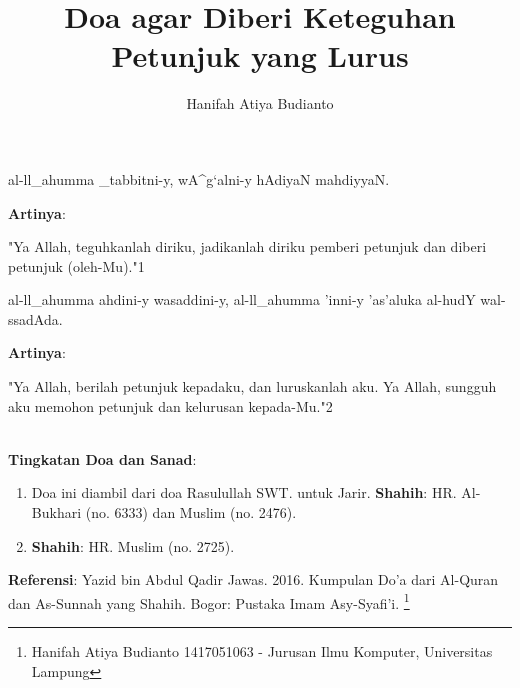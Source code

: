 \documentclass[a4paper,12pt]{article}
\title{\Large Doa agar Diberi Keteguhan Petunjuk yang Lurus}
\author{\calligra Hanifah Atiya Budianto}
\begin{document}
\sffamily
\maketitle 
\fullvocalize
{}
\begin{arabtext}
\noindent
al-ll_ahumma _tabbitni-y, wA^g`alni-y hAdiyaN mahdiyyaN.\\
\end{arabtext}
\noindent
\textbf{Artinya}:
\par
\indent
"Ya Allah, teguhkanlah diriku, jadikanlah diriku pemberi petunjuk dan 
diberi petunjuk (oleh-Mu)."{\scriptsize 1}\\
\begin{arabtext}
\noindent
al-ll_ahumma ahdini-y wasaddini-y, al-ll_ahumma 'inni-y 'as'aluka al-hudY 
wal-ssadAda.\\
\end{arabtext}
\noindent
\textbf{Artinya}:
\par
\indent
"Ya Allah, berilah petunjuk kepadaku, dan luruskanlah aku. Ya Allah, 
sungguh aku memohon petunjuk dan kelurusan kepada-Mu."{\scriptsize 2}\\\\
\par
\noindent
\textbf{Tingkatan Doa dan Sanad}:
\begin{enumerate}
\item Doa ini diambil dari doa Rasulullah SWT. untuk Jarir. 
\textbf{Shahih}: HR. Al-Bukhari (no. 6333) dan Muslim (no. 2476).
\item \textbf{Shahih}: HR. Muslim (no. 2725).
\end{enumerate}
\textbf{Referensi}: Yazid bin Abdul Qadir Jawas. 2016. Kumpulan Do'a dari
Al-Quran dan As-Sunnah yang Shahih. Bogor: Pustaka Imam Asy-Syafi'i.
\footnote{Hanifah Atiya Budianto 1417051063 - Jurusan Ilmu Komputer,
Universitas Lampung}
\end{document}
